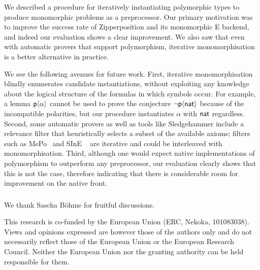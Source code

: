 \documentclass[runningheads]{llncs}
\begin{document}
We described a procedure for iteratively instantiating polymorphic types to
produce monomorphic problems as a preprocessor. Our primary motivation was to
improve the success rate of Zipperposition and its monomorphic E backend, and
indeed our evaluation shows a clear improvement. We also saw that even with
automatic provers that support polymorphism, iterative monomorphisation is a
better alternative in practice.

We see the following avenues for future work. First, iterative monomorphisation
blindly enumerates candidate instantiations, without exploiting any knowledge
about the logical structure of the formulas in which symbols occur. For
example, a lemma $\textsf{p}\langle\alpha\rangle$ cannot be used to prove the
conjecture $\lnot \textsf{p}\langle\textsf{nat}\rangle$ because of the incompatible
polarities, but our procedure instantiates $\alpha$ with $\textsf{nat}$ regardless.
Second, some automatic provers as well as tools like Sledgehammer include a
relevance filter that heuristically selects a subset of the available axioms;
filters such as MePo~\cite{meng-paulson-2009} and SInE
~\cite{hoder-voronkov-2011} are iterative and could be interleaved with
monomorphisation. Third, although one would expect native implementations of
polymorphism to outperform any preprocessor, our evaluation clearly shows that
this is not the case, therefore indicating that there is considerable room for
improvement on the native front.

\begin{credits}
   \subsubsection{\ackname}

   We thank Sascha Böhme for fruitful discussions.

   This research is co-funded by the European Union (ERC, Nekoka, 101083038). Views and opinions expressed are however those of the authors only and do not necessarily reflect those of the European Union or the European Research Council. Neither the European Union nor the granting authority can be held responsible for them.
\end{credits}



\end{document}
